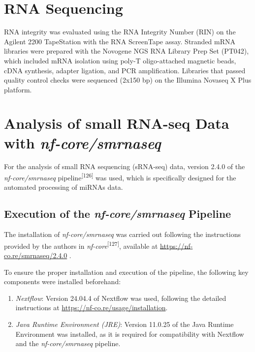 \documentclass[
  11pt,
  letterpaper,
]{book}
\begin{document}
\section{RNA Sequencing}\label{rna-sequencing}

RNA integrity was evaluated using the RNA Integrity Number (RIN) on the
Agilent 2200 TapeStation with the RNA ScreenTape assay. Stranded mRNA
libraries were prepared with the Novogene NGS RNA Library Prep Set
(PT042), which included mRNA isolation using poly-T oligo-attached
magnetic beads, cDNA synthesis, adapter ligation, and PCR amplification.
Libraries that passed quality control checks were sequenced (2x150 bp)
on the Illumina Novaseq X Plus platform.

\section{\texorpdfstring{Analysis of small RNA-seq Data with
\emph{nf-core/smrnaseq}}{Analysis of small RNA-seq Data with nf-core/smrnaseq}}\label{analysis-of-small-rna-seq-data-with-nf-coresmrnaseq}

For the analysis of small RNA sequencing (sRNA-seq) data, version 2.4.0
of the \emph{nf-core/smrnaseq} pipeline\textsuperscript{{[}126{]}} was
used, which is specifically designed for the automated processing of
miRNAs data.

\subsection{\texorpdfstring{Execution of the \emph{nf-core/smrnaseq}
Pipeline}{Execution of the nf-core/smrnaseq Pipeline}}\label{execution-of-the-nf-coresmrnaseq-pipeline}

The installation of \emph{nf-core/smrnaseq} was carried out following
the instructions provided by the authors in
\emph{nf-core}\textsuperscript{{[}127{]}}, available at
\url{https://nf-co.re/smrnaseq/2.4.0} .

To ensure the proper installation and execution of the pipeline, the
following key components were installed beforehand:

\begin{enumerate}
\def\labelenumi{\arabic{enumi}.}
\item
  \emph{Nextflow}: Version 24.04.4 of Nextflow was used, following the
  detailed instructions at \url{https://nf-co.re/usage/installation}.
\item
  \emph{Java Runtime Environment (JRE)}: Version 11.0.25 of the Java
  Runtime Environment was installed, as it is required for compatibility
  with Nextflow and the \emph{nf-core/smrnaseq} pipeline.
\end{enumerate}
\end{document}
